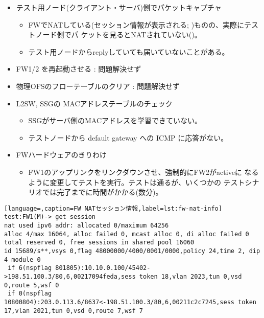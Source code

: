 \begin{itemize}
 \item テスト用ノード(クライアント・サーバ)側でパケットキャプチャ
       \begin{itemize}
        \item FWでNATしている(セッション情報が表示される;
              )ものの、実際にテストノード側でパ
              ケットを見るとNATされていない()。
        \item テスト用ノードからreplyしていても届いていないことがある。
       \end{itemize}
 \item FW1/2 を再起動させる : 問題解決せず
 \item 物理OFSのフローテーブルのクリア : 問題解決せず
 \item L2SW, SSGの MACアドレステーブルのチェック
       \begin{itemize}
        \item SSGがサーバ側のMACアドレスを学習できていない。
        \item テストノードから default gateway への ICMP に応答がない。
       \end{itemize}
 \item FWハードウェアのきりわけ
       \begin{itemize}
        \item FW1のアップリンクをリンクダウンさせ、強制的にFW2がactiveに
              なるように変更してテストを実行。テストは通るが、いくつかの
              テストシナリオでは完了までに時間がかかる(数分)。
       \end{itemize}
\end{itemize}

\begin{lstlisting}[language=,caption=FW NATセッション情報,label=lst:fw-nat-info]
test:FW1(M)-> get session
nat used ipv6 addr: allocated 0/maximum 64256
alloc 4/max 16064, alloc failed 0, mcast alloc 0, di alloc failed 0
total reserved 0, free sessions in shared pool 16060
id 15689/s**,vsys 0,flag 48000000/4000/0001/0000,policy 24,time 2, dip 4 module 0
 if 6(nspflag 801805):10.10.0.100/45402->198.51.100.3/80,6,00217094feda,sess token 18,vlan 2023,tun 0,vsd 0,route 5,wsf 0
 if 0(nspflag 10800804):203.0.113.6/8637<-198.51.100.3/80,6,00211c2c7245,sess token 17,vlan 2021,tun 0,vsd 0,route 7,wsf 7
\end{lstlisting}

